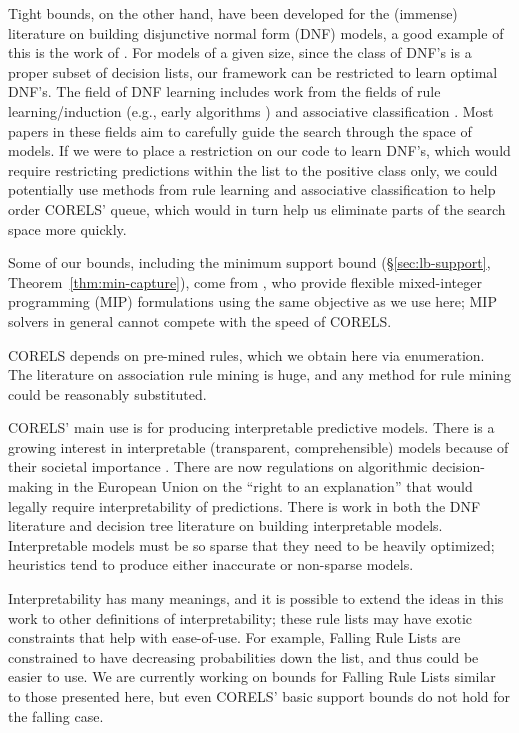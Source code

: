 Tight bounds, on the other hand, have been developed for the (immense) literature on building disjunctive normal form (DNF) models, a good example of this is the work of \citet{Rijnbeek10}.
For models of a given size, since the class of DNF's is a proper subset of decision lists, our framework can be restricted to learn optimal DNF's. The field of DNF learning includes work from the fields of rule learning/induction (e.g., early algorithms \citep{Michalski1969,ClarkNiblett1989,Frank1998}) and associative classification \citep{Vanhoof10}. Most papers in these fields aim to carefully guide the search through the space of models. If we were to place a restriction on our code to learn DNF's, which would require restricting predictions within the list to the positive class only, we could potentially use methods from rule learning and associative classification to help order CORELS' queue, which would in turn help us eliminate parts of the search space more quickly. 

Some of our bounds, including the minimum support bound
(\S\ref{sec:lb-support}, Theorem~\ref{thm:min-capture}),
come from \citet{RudinEr15}, who provide flexible mixed-integer programming (MIP)
formulations using the same objective as we use here;
MIP solvers in general cannot compete with the speed of CORELS.

CORELS depends on pre-mined rules, which we obtain here via enumeration.
The literature on association rule mining is huge, and any method for rule mining could be reasonably substituted.

CORELS' main use is for producing interpretable predictive models. There is a growing interest in interpretable (transparent, comprehensible) models because of their societal importance \citep[see][]{ruping2006learning,bratko1997machine,dawes1979robust,VellidoEtAl12,Giraud98,Holte93,Schmueli10,Huysmans11,Freitas14}. There are now regulations on algorithmic decision-making in the European Union on the ``right to an explanation'' \citep{Goodman2016EU} that would legally require interpretability of predictions. There is work in both the DNF literature \citep{Ruckert2008} and decision tree literature \citep{GarofalakisHyRaSh00} on building interpretable models. Interpretable models must be so sparse that they need to be heavily optimized; heuristics tend to produce either inaccurate or non-sparse models.

Interpretability has many meanings, and it is possible to extend the ideas in this work to other definitions of interpretability; these rule lists may have exotic constraints that help with ease-of-use. For example, Falling Rule Lists \citep{WangRu15} are constrained to have decreasing probabilities down the list, and thus could be easier to use. We are currently working on bounds for Falling Rule Lists \citep{ChenRu17} similar to those presented here, but even CORELS' basic support bounds do not hold for the falling case. 

